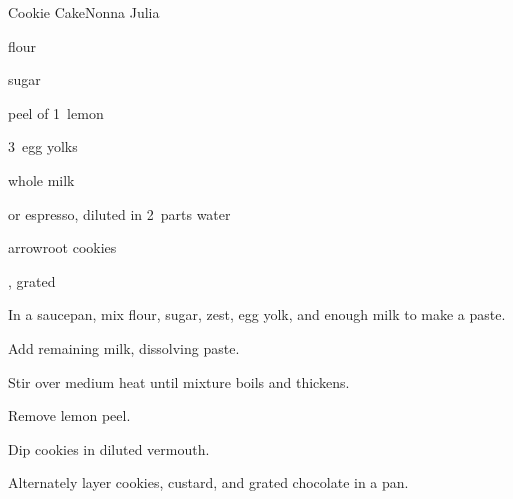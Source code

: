 \begin{recipe}{Cookie Cake}{Nonna Julia}{}

\begin{ingredients}
\item {} flour
\item \C{\half} sugar
\item peel of 1~lemon
\item 3~egg yolks
\item {} whole milk
\item {} or espresso, diluted in 2~parts water
\item arrowroot cookies
\item {}, grated
\end{ingredients}

\begin{directions}
\item In a saucepan, mix flour, sugar, zest, egg yolk, and enough milk to make a paste.
\item Add remaining milk, dissolving paste.
\item Stir over medium heat until mixture boils and thickens.
\item Remove lemon peel.
\item Dip cookies in diluted vermouth.
\item Alternately layer cookies, custard, and grated chocolate in a pan.
\end{directions}

\end{recipe}
